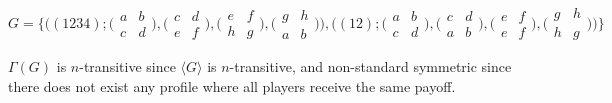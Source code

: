 \begin{example}
\[G = \{ \bigl((1234) ; \bigl(\begin{smallmatrix} a & b \\ c & d \end{smallmatrix}\bigr), \bigl(\begin{smallmatrix} c & d \\ e & f \end{smallmatrix}\bigr), \bigl(\begin{smallmatrix} e & f \\ h & g \end{smallmatrix}\bigr), \bigl(\begin{smallmatrix} g & h \\ a & b \end{smallmatrix}\bigr)\bigr), 
               \bigl((12) ; \bigl(\begin{smallmatrix} a & b \\ c & d \end{smallmatrix}\bigr), \bigl(\begin{smallmatrix} c & d \\ a & b \end{smallmatrix}\bigr), \bigl(\begin{smallmatrix} e & f \\ e & f \end{smallmatrix}\bigr), \bigl(\begin{smallmatrix} g & h \\ h & g \end{smallmatrix}\bigr)\bigr)\}\]

$\Gamma(G)$ is $n$-transitive since $\langle{G}\rangle$ is $n$-transitive, and non-standard symmetric since there does not exist any profile where all players receive the same payoff.
\end{example}

